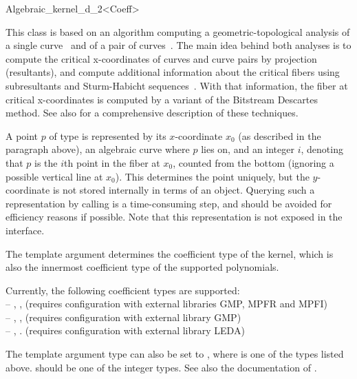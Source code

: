 \begin{ccRefClass}{Algebraic_kernel_d_2<Coeff>}


\ccDefinition

This class is based on an algorithm computing a 
geometric-topological analysis of a single curve~\cite{ekw-fast-07} and of a
pair of curves~\cite{ek-exact-08}.
The main idea behind both analyses is to compute the critical
x-coordinates of curves and curve pairs by projection (resultants), and compute
additional information about the critical fibers using subresultants
and Sturm-Habicht sequences~\cite{grlr-sturm-habicht-98}. 
With that information, the fiber at    
critical x-coordinates is computed by a variant of the Bitstream
Descartes method.
See also \cite{kerber-phd-09} for a comprehensive description of
these techniques. 

A point $p$ of type  is represented
by its $x$-coordinate $x_0$ (as described in the 
paragraph above), an algebraic curve where $p$ lies on, and an
integer $i$, denoting that $p$ is the $i$th point in the fiber at $x_0$,
counted from the bottom (ignoring a possible vertical line at $x_0$).
This determines the point uniquely, but the $y$-coordinate 
is not stored internally in terms of an  object.
Querying such a representation by calling  is a
time-consuming step, and should be avoided for efficiency reasons if possible.
Note that this representation is not exposed in the interface. 

The template argument  determines the coefficient type of the 
kernel, which is also the innermost coefficient type of the supported polynomials.  

Currently, the following coefficient types are supported:\\
-- , , (requires configuration with external libraries GMP, MPFR and MPFI)\\
-- , , (requires configuration with external library GMP) \\ 
-- , . (requires configuration with external library LEDA)\\

\begin{ccAdvanced}
The template argument type can also be set to , where  
is one of the types listed above.  should be one of the integer types. 
See also the documentation of . 
\end{ccAdvanced}


\end{ccRefClass}
